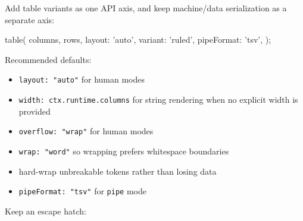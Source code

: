 Add table variants as one API axis, and keep machine/data serialization as a separate axis:

\begin{CodeBlock}
table({
  columns,
  rows,
  layout: 'auto',
  variant: 'ruled',
  pipeFormat: 'tsv',
});
\end{CodeBlock}

Recommended defaults:

\begin{itemize}
\tightlist
\item
  \texttt{l\allowbreak{}a\allowbreak{}y\allowbreak{}o\allowbreak{}u\allowbreak{}t\allowbreak{}:\allowbreak{} \allowbreak{}"\allowbreak{}a\allowbreak{}u\allowbreak{}t\allowbreak{}o\allowbreak{}"} for human modes
\item
  \texttt{w\allowbreak{}i\allowbreak{}d\allowbreak{}t\allowbreak{}h\allowbreak{}:\allowbreak{} \allowbreak{}c\allowbreak{}t\allowbreak{}x\allowbreak{}.\allowbreak{}r\allowbreak{}u\allowbreak{}n\allowbreak{}t\allowbreak{}i\allowbreak{}m\allowbreak{}e\allowbreak{}.\allowbreak{}c\allowbreak{}o\allowbreak{}l\allowbreak{}u\allowbreak{}m\allowbreak{}n\allowbreak{}s} for string rendering when no explicit width is provided
\item
  \texttt{o\allowbreak{}v\allowbreak{}e\allowbreak{}r\allowbreak{}f\allowbreak{}l\allowbreak{}o\allowbreak{}w\allowbreak{}:\allowbreak{} \allowbreak{}"\allowbreak{}w\allowbreak{}r\allowbreak{}a\allowbreak{}p\allowbreak{}"} for human modes
\item
  \texttt{w\allowbreak{}r\allowbreak{}a\allowbreak{}p\allowbreak{}:\allowbreak{} \allowbreak{}"\allowbreak{}w\allowbreak{}o\allowbreak{}r\allowbreak{}d\allowbreak{}"} so wrapping prefers whitespace boundaries
\item
  hard-wrap unbreakable tokens rather than losing data
\item
  \texttt{p\allowbreak{}i\allowbreak{}p\allowbreak{}e\allowbreak{}F\allowbreak{}o\allowbreak{}r\allowbreak{}m\allowbreak{}a\allowbreak{}t\allowbreak{}:\allowbreak{} \allowbreak{}"\allowbreak{}t\allowbreak{}s\allowbreak{}v\allowbreak{}"} for \texttt{p\allowbreak{}i\allowbreak{}p\allowbreak{}e} mode
\end{itemize}

Keep an escape hatch:

